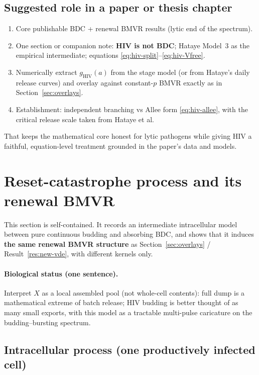 \documentclass[11pt,a4paper]{article}
\theoremstyle{plain}
\theoremstyle{definition}
\theoremstyle{remark}
\begin{document}
\subsection{Suggested role in a paper or thesis chapter}

\begin{enumerate}
\item Core publishable BDC + renewal BMVR results (lytic end of the spectrum).
\item One section or companion note: \textbf{HIV is not BDC}; Hataye Model~3
as the empirical intermediate; equations
\eqref{eq:hiv-split}--\eqref{eq:hiv-Vfree}.
\item Numerically extract $g_{\mathrm{HIV}}(a)$ from the stage model (or from
Hataye's daily release curves) and overlay against constant-$p$ BMVR exactly as
in Section~\ref{sec:overlays}.
\item Establishment: independent branching vs Allee form \eqref{eq:hiv-allee},
with the critical release scale taken from Hataye et al.
\end{enumerate}
That keeps the mathematical core honest for lytic pathogens while giving HIV a
faithful, equation-level treatment grounded in the paper's data and models.

\section{Reset-catastrophe process and its renewal BMVR}
\label{sec:reset-bmvr}

This section is self-contained. It records an intermediate intracellular model
between pure continuous budding and absorbing BDC, and shows that it induces
\textbf{the same renewal BMVR structure} as Section~\ref{sec:overlays} / 
Result~\ref{res:new-vde}, with different kernels only.

\paragraph{Biological status (one sentence).}
Interpret $X$ as a local assembled pool (not whole-cell contents): full dump is a
mathematical extreme of batch release; HIV budding is better thought of as many
small exports, with this model as a tractable multi-pulse caricature on the
budding--bursting spectrum.

\subsection{Intracellular process (one productively infected cell)}
\end{document}
